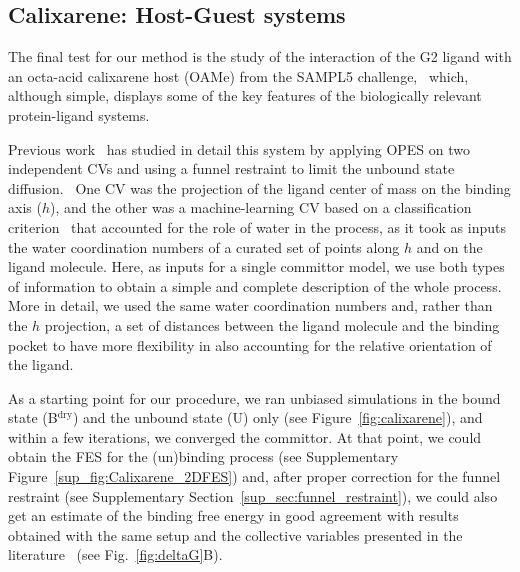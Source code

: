     
\subsection{Calixarene: Host-Guest systems}

    The final test for our method is the study of the interaction of the G2 ligand with an octa-acid calixarene host (OAMe) from the SAMPL5 challenge,~\cite{yin2017overview} which, although simple, displays some of the key features of the biologically relevant protein-ligand systems. 
    
    Previous work~\cite{rizzi2021role} has studied in detail this system by applying OPES on two independent CVs and using a funnel restraint to limit the unbound state diffusion.~\cite{limongelli2013funnel}
    One CV was the projection of the ligand center of mass on the binding axis ($h$), and the other was a machine-learning CV based on a classification criterion~\cite{bonati2020data} that accounted for the role of water in the process, as it took as inputs the water coordination numbers of a curated set of points along $h$ and on the ligand molecule.
    Here, as inputs for a single committor model, we use both types of information to obtain a simple and complete description of the whole process.
    More in detail, we used the same water coordination numbers and, rather than the $h$ projection, a set of distances between the ligand molecule and the binding pocket to have more flexibility in also accounting for the relative orientation of the ligand.
    
    As a starting point for our procedure, we ran unbiased simulations in the bound state (B$^{\text{dry}}$) and the unbound state (U) only (see Figure~\ref{fig:calixarene}), and within a few iterations, we converged the committor.
    At that point, we could obtain the FES for the (un)binding process (see Supplementary Figure~\ref{sup_fig:Calixarene_2DFES}) and, after proper correction for the funnel restraint (see Supplementary Section~\ref{sup_sec:funnel_restraint}), we could also get an estimate of the binding free energy
    in good agreement with results obtained with the same setup and the collective variables presented in the literature~\cite{rizzi2021role} (see Fig.~\ref{fig:deltaG}B).

